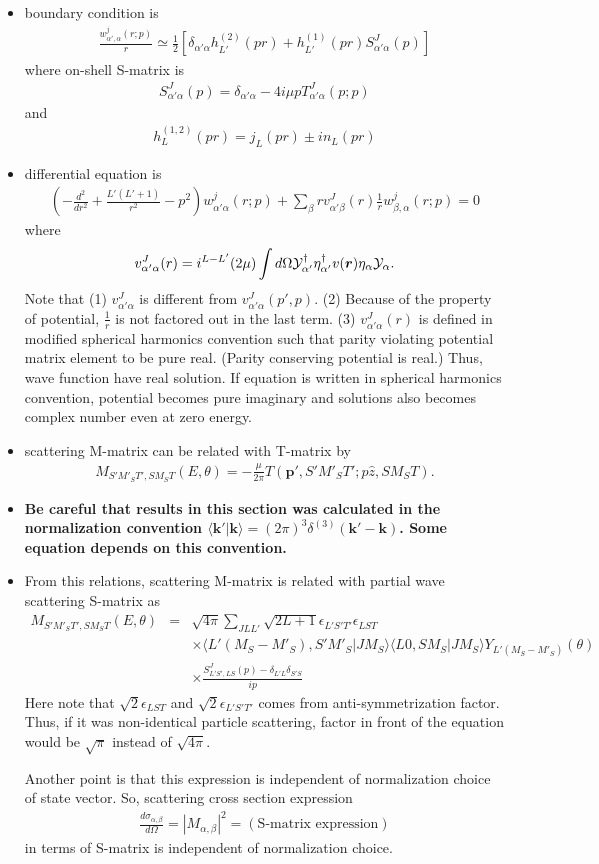 \documentclass[10pt]{article}
\def\bm{\boldsymbol}
\newcommand{\bea}{\begin{eqnarray}}
\newcommand{\eea}{\end{eqnarray}}
\newcommand{\no}{\nonumber \\}
\def\vp{{\bm p}}
\def\vk{{\bm k}}
\def\vr{{\bm r}}
\def\la{\langle}
\def\ra{\rangle}
\begin{document}
\begin{itemize}
\item boundary condition is
\bea
\frac{w_{\alpha',\alpha}^j(r;p)}{r}
\simeq \frac{1}{2}[\delta_{\alpha'\alpha}h^{(2)}_{L'}(pr)
          +h_{L'}^{(1)}(pr) S^J_{\alpha'\alpha}(p)]
\eea
where on-shell S-matrix is
\bea
S^J_{\alpha'\alpha}(p)
=\delta_{\alpha'\alpha}-4i\mu p T^J_{\alpha'\alpha}(p;p)
\eea
and 
\bea
h_L^{(1,2)}(pr)=j_{L}(pr)\pm i n_L(pr)
\eea
\item differential equation is
\bea
\left(-\frac{d^2}{dr^2}+\frac{L'(L'+1)}{r^2}-p^2\right)w^j_{\alpha'\alpha}(r;p)+\sum_{\beta} r v^J_{\alpha'\beta}(r)\frac{1}{r} w^j_{\beta,\alpha}(r;p)=0
\eea
where
\bea
v^J_{\alpha'\alpha}(r)=i^{L-L'} (2\mu)
  \int d\Omega {\cal Y}_{\alpha'}^\dagger\eta^\dagger_{\alpha'}
            v(\vr) \eta_\alpha {\cal Y}_{\alpha}.             
\eea
Note that (1) $v^J_{\alpha'\alpha}$ is different from $v^J_{\alpha'\alpha}(p',p)$. (2) Because of the property of potential, $\frac{1}{r}$
is not factored out in the last term. (3) $v^J_{\alpha'\alpha}(r)$
is defined in modified spherical harmonics convention such that
parity violating potential matrix element to be pure real. 
(Parity conserving potential is real.)
Thus,
wave function have real solution. If equation is written in spherical
harmonics convention, potential becomes pure imaginary and solutions 
also becomes complex number even at zero energy.

\item scattering M-matrix can be related with T-matrix by
\bea
M_{S' M'_S T',SM_S T}(E,\theta)=-\frac{\mu}{2\pi} T(\vp',S' M'_S T'; p\hat{z},S M_S T).
\eea
\item {\bf Be careful that results in this section was calculated 
in the normalization convention $\la \vk'|\vk\ra=(2\pi)^3\delta^{(3)}(\vk'-\vk)$. Some equation depends on this convention.}
\item From this relations, scattering M-matrix is related 
with partial wave scattering S-matrix as
\bea
M_{S'M'_ST',SM_ST}(E,\theta)
&=&\sqrt{4\pi}\sum_{JLL'}\sqrt{2L+1}\epsilon_{L'S'T'}\epsilon_{LST}
\no & &\times
 \la L' (M_S-M'_S),S' M'_S|J M_S\ra
 \la L0,S M_S|J M_S\ra
 Y_{L'(M_S-M'_S)}(\theta) \no & &\times
 \frac{S^J_{L'S',LS}(p)-\delta_{L'L}\delta_{S'S}}{ip}
\eea
Here note that $\sqrt{2}\epsilon_{LST}$ and $\sqrt{2}\epsilon_{L'S'T'}$
comes from anti-symmetrization factor.
Thus, if it was non-identical particle scattering,
factor in front of the equation would be $\sqrt{\pi}$
instead of $\sqrt{4\pi}$. 

Another point is that this expression is independent of normalization choice of state vector. So, scattering cross section expression
\bea
\frac{d\sigma_{\alpha,\beta}}{d\Omega}=|M_{\alpha,\beta}|^2
 =(\mbox{S-matrix expression})
\eea
in terms of S-matrix is independent of normalization choice.

\end{itemize}
\newpage
\end{document}
